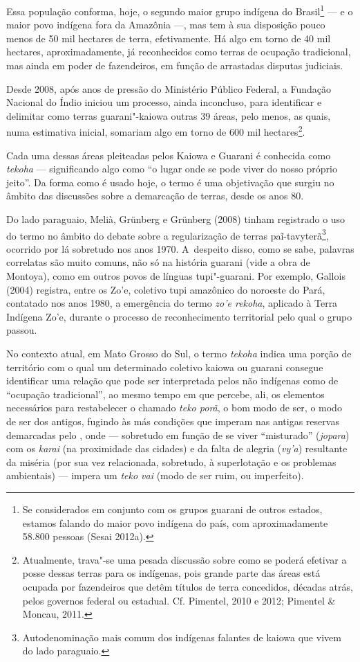 Essa população conforma, hoje, o segundo maior grupo indígena do
Brasil\footnote{Se considerados em conjunto com os grupos guarani de
outros estados, estamos falando do maior povo indígena do país, com
aproximadamente 58.800 pessoas (Sesai 2012a).} --- e o maior povo
indígena fora da Amazônia ---, mas tem à sua disposição pouco menos de 50
mil hectares de terra, efetivamente. Há algo em torno de 40 mil
hectares, aproximadamente, já reconhecidos como terras de ocupação
tradicional, mas ainda em poder de fazendeiros, em função de arrastadas
disputas judiciais. 

Desde 2008, após anos de pressão do Ministério Público Federal, a
Fundação Nacional do Índio iniciou um processo, ainda inconcluso, para
identificar e delimitar como terras guarani"-kaiowa outras 39 áreas,
pelo menos, as quais, numa estimativa inicial, somariam algo em torno
de 600 mil hectares\footnote{Atualmente, trava"-se uma pesada discussão
sobre como se poderá efetivar a posse dessas terras para os indígenas,
pois grande parte das áreas está ocupada por fazendeiros que detêm
títulos de terra concedidos, décadas atrás, pelos governos federal ou
estadual. Cf. Pimentel, 2010 e 2012; Pimentel \& Moncau, 2011.}. 

Cada uma dessas áreas pleiteadas pelos Kaiowa e Guarani é conhecida como
\emph{tekoha} --- significando algo como ``o lugar onde se pode viver do nosso
próprio jeito''. Da forma como é usado hoje, o termo é uma objetivação
que surgiu no âmbito das discussões sobre a demarcação de terras, desde
os anos 80. 

Do lado paraguaio, Melià, Grünberg e Grünberg (2008) tinham registrado o
uso do termo no âmbito do debate sobre a regularização de terras
paĩ{}-tavyterã\footnote{Autodenominação mais comum dos indígenas
falantes de kaiowa que vivem do lado paraguaio.}, ocorrido por lá
sobretudo nos anos 1970. A~despeito disso, como se sabe, palavras
correlatas são muito comuns, não só na história guarani (vide a obra de
Montoya), como em outros povos de línguas tupi"-guarani. Por exemplo,
Gallois (2004) registra, entre os Zo’e, coletivo tupi amazônico do
noroeste do Pará, contatado nos anos 1980, a emergência do termo \emph{zo’e
rekoha}, aplicado à Terra Indígena Zo’e, durante o processo de
reconhecimento territorial pelo qual o grupo passou. 

No contexto atual, em Mato Grosso do Sul, o termo \emph{tekoha} indica uma
porção de território com o qual um determinado coletivo kaiowa ou
guarani consegue identificar uma relação que pode ser interpretada
pelos não indígenas como de ``ocupação tradicional'', ao mesmo tempo em
que percebe, ali, os elementos necessários para restabelecer o chamado
\emph{teko porã}, o bom modo de ser, o modo de ser dos antigos, fugindo às más
condições que imperam nas antigas reservas demarcadas pelo , onde ---
sobretudo em função de se viver ``misturado'' (\emph{jopara}) com os \emph{karai} (na
proximidade das cidades) e da falta de alegria (\emph{vy’a}) resultante da
miséria (por sua vez relacionada, sobretudo, à superlotação e os
problemas ambientais) --- impera um \emph{teko vai} (modo de ser ruim, ou
imperfeito).

